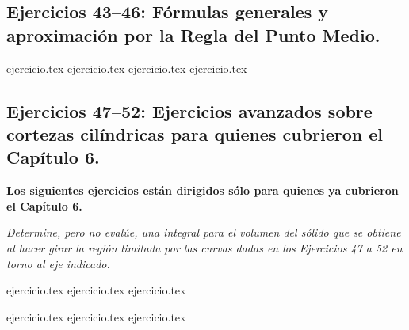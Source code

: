 \subsection*{Ejercicios 43--46: Fórmulas generales y aproximación por la Regla del Punto Medio.}

\begin{enumerate}
    \setcounter{enumi}{42}
    {ejercicio.tex}
    {ejercicio.tex}
    {ejercicio.tex}
    {ejercicio.tex}
\end{enumerate}

\subsection*{Ejercicios 47--52: Ejercicios avanzados sobre cortezas cilíndricas para quienes cubrieron el Capítulo 6.}

\noindent \textbf{\large Los siguientes ejercicios están dirigidos sólo para quienes ya cubrieron el Capítulo 6.}

\vspace{1em}
\noindent \textit{Determine, pero no evalúe, una integral para el volumen del sólido que se obtiene al hacer girar la región limitada por las curvas dadas en los Ejercicios 47 a 52 en torno al eje indicado.}

\begin{enumerate}
    \setcounter{enumi}{46}
    \begin{minipage}{0.45\textwidth}
    {ejercicio.tex}
    {ejercicio.tex}
    {ejercicio.tex}
    \end{minipage}%
    \begin{minipage}{0.45\textwidth}
    {ejercicio.tex}
    {ejercicio.tex}
    {ejercicio.tex}
    \end{minipage}
\end{enumerate}
